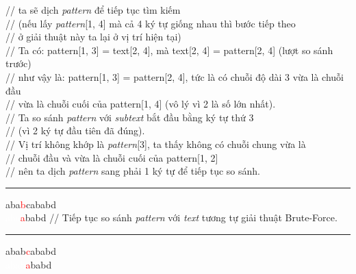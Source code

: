 \documentclass[a4paper,11pt]{article}
\begin{document}
																							\hspace*{2.9cm} // ta sẽ dịch \textit{pattern} để tiếp tục tìm kiếm\\
																							\hspace*{2.9cm} // (nếu lấy \textit{pattern}[1, 4] mà cả 4 ký tự giống nhau thì bước tiếp theo  \\
																							\hspace*{2.9cm} // ở giải thuật này ta lại ở vị trí hiện tại) \\
																							\hspace*{2.9cm} // Ta có: pattern[1, 3] = text[2, 4], mà text[2, 4] = pattern[2, 4] (lượt so sánh trước) \\
																							\hspace*{2.9cm} // như vậy là: pattern[1, 3] = pattern[2, 4], tức là có chuỗi độ dài 3 vừa là chuỗi đầu \\
																							\hspace*{2.9cm} // vừa là chuỗi cuối của pattern[1, 4] (vô lý vì 2 là số lớn nhất).\\
																							\hspace*{2.9cm} // Ta so sánh \textit{pattern} với \textit{subtext} bắt đầu bằng ký tự thứ 3 \\
																							\hspace*{2.9cm} // (vì 2 ký tự đầu tiên đã đúng). \\
																							\hspace*{2.9cm} // Vị trí không khớp là \textit{pattern}[3],  ta thấy không có chuỗi chung vừa là \\
																							\hspace*{2.9cm} // chuỗi đầu và vừa là chuỗi cuối của pattern[1, 2]\\
																							\hspace*{2.9cm} // nên ta dịch \textit{pattern} sang phải 1 ký tự để tiếp tục so sánh.

			\vspace*{2mm}
			\hrule
			aba\textcolor{red}{b}cababd\\
			\textcolor{white}{aba}\textcolor{red}{a}babd 						\hspace*{1.2cm} // Tiếp tục so sánh \textit{pattern} với \textit{text} tương tự giải thuật Brute-Force. 

			\vspace*{2mm}
			\hrule
			abab\textcolor{red}{c}ababd\\
			\textcolor{white}{abab}\textcolor{red}{a}babd 		
\end{document}
